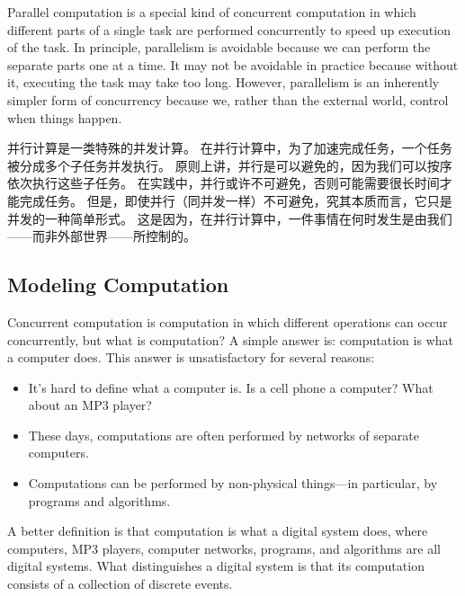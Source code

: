 \documentclass[fleqn,leqno]{article}
\begin{document}
\begin{en}
Parallel computation is a special kind of concurrent computation in
which different parts of a single task are performed concurrently to
speed up execution of the task.  In principle, parallelism is
avoidable because we can perform the separate parts one at a time.  It
may not be avoidable in practice because without it, executing the
task may take too long.  However, parallelism is an inherently simpler
form of concurrency because we, rather than the external world,
control when things happen.
\end{en}

\begin{ch}
并行计算是一类特殊的并发计算。
在并行计算中，为了加速完成任务，一个任务被分成多个子任务并发执行。
原则上讲，并行是可以避免的，因为我们可以按序依次执行这些子任务。
在实践中，并行或许不可避免，否则可能需要很长时间才能完成任务。
但是，即使并行（同并发一样）不可避免，究其本质而言，它只是并发的一种简单形式。
这是因为，在并行计算中，一件事情在何时发生是由我们——而非外部世界——所控制的。
\end{ch}

\begin{en}
\subsection{Modeling Computation} \label{sec:computing-devices}

Concurrent computation is computation in which different operations
can occur concurrently, but 
what is computation?  A simple answer is:
computation is what a computer does.  This answer is unsatisfactory
for several reasons:
\begin{itemize}
\item It's hard to define what a computer is.  Is a cell phone a
computer?  What about an MP3 player?

\item These days, computations are often performed by networks of
separate computers.

\item Computations can be performed by non-physical things---in particular,
by programs and algorithms.
\end{itemize}
A better definition is that computation is what a digital system does,
where computers, MP3 players, computer networks, programs, and
algorithms are all digital systems.  What distinguishes a digital
system is that its computation consists of a collection of discrete
events.  
\end{en}
\end{document}
